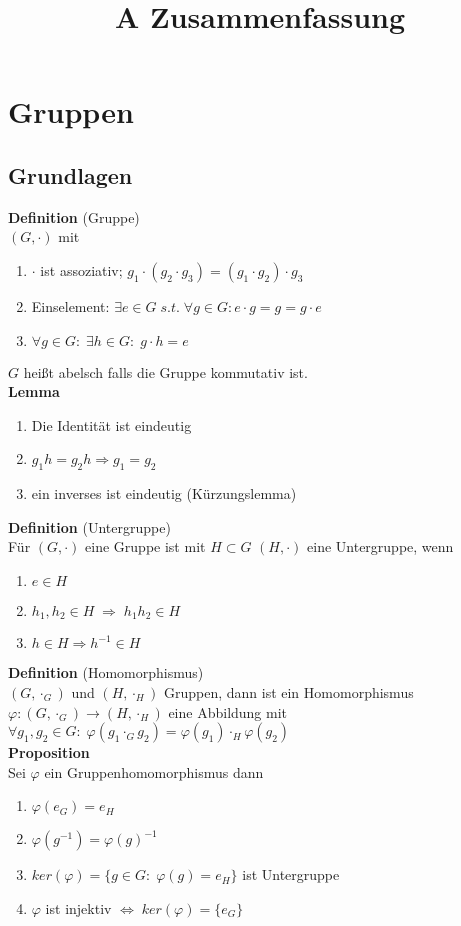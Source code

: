 \documentclass[a4paper, 12pt]{article}
\begin{document}
	\begin{titlepage} 
		\title{A Zusammenfassung}
		\clearpage\maketitle
		\thispagestyle{empty}
	\end{titlepage}
	\tableofcontents
	\section{Gruppen}
	\subsection{Grundlagen}
	\textbf{Definition} (Gruppe)\\ $(G,\cdot)$ mit \begin{enumerate}
		\item $\cdot$ ist assoziativ; $g_1 \cdot (g_2 \cdot g_3) = (g_1 \cdot g_2) \cdot g_3$
		\item Einselement: $\exists e \in G\; s.t.\; \forall g \in G: e\cdot g = g = g\cdot e$
		\item $\forall g \in G: \; \exists h \in G: \; g\cdot h = e$
	\end{enumerate}
$G$ heißt abelsch falls die Gruppe kommutativ ist.\\
\textbf{Lemma} \begin{enumerate}
	\item Die Identität ist eindeutig
	\item $g_1h = g_2h \Rightarrow g_1 = g_2$
	\item ein inverses ist eindeutig (Kürzungslemma)
\end{enumerate}
\textbf{Definition} (Untergruppe)\\
Für $(G,\cdot)$ eine Gruppe ist mit $H\subset G$ $(H,\cdot)$ eine Untergruppe, wenn \begin{enumerate}
	\item $e \in H$
	\item $h_1, h_2 \in H \; \Rightarrow \; h_1h_2 \in H$
	\item $h \in H \Rightarrow h^{-1} \in H$
\end{enumerate}
\textbf{Definition} (Homomorphismus)\\
$(G,\cdot_G)$ und $(H,\cdot_H)$ Gruppen, dann ist ein Homomorphismus $\varphi: (G,\cdot_G) \to (H,\cdot_H)$ eine Abbildung mit $\forall g_1, g_2 \in G: \; \varphi(g_1 \cdot_G g_2) = \varphi(g_1) \cdot_H \varphi(g_2)$\\
\textbf{Proposition}\\ Sei $\varphi$ ein Gruppenhomomorphismus dann \begin{enumerate}
	\item $\varphi(e_G) = e_H$
	\item $\varphi(g^{-1}) = \varphi(g)^{-1}$
	\item $ker(\varphi) = \{g \in G: \; \varphi(g) = e_H\}$ ist Untergruppe
	\item $\varphi$ ist injektiv $\Leftrightarrow \; ker(\varphi) = \{e_G\}$
\end{enumerate}  
\end{document}
